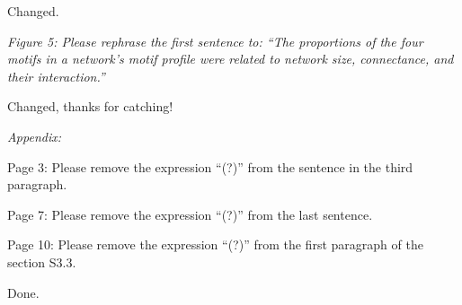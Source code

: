 \documentclass[12pt]{article}
\newcommand{\us}{\rm \setlength{\leftskip}{0.3cm} \setlength{\rightskip}{0.3cm}}
\newcommand{\them}{\it \setlength{\leftskip}{0cm} \setlength{\rightskip}{0cm}}
\begin{document}
\us
Changed.

\them
Figure 5: Please rephrase the first sentence to: “The proportions of the four motifs in a network's motif profile were related to network size, connectance, and their interaction.”

\us
Changed, thanks for catching!

\them
Appendix:

Page 3: Please remove the expression “(?)” from the sentence in the third paragraph.

Page 7: Please remove the expression “(?)” from the last sentence.

Page 10: Please remove the expression “(?)” from the first paragraph of the section S3.3.

\us
Done.
\end{document}
